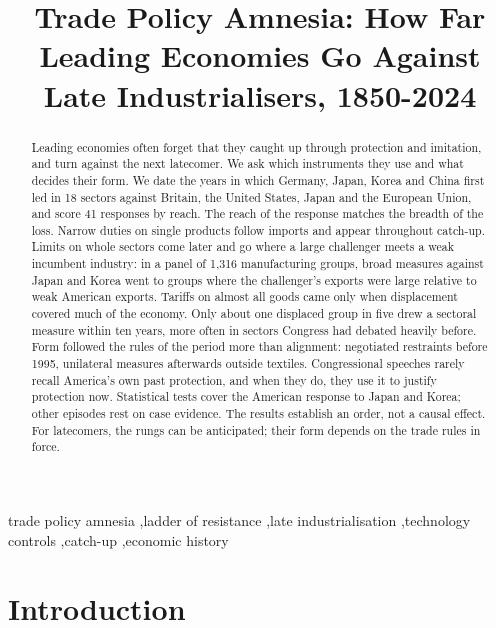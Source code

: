 \documentclass[review,authoryear,12pt]{elsarticle}
\begin{document}
\begin{frontmatter}
\title{Trade Policy Amnesia: How Far Leading Economies Go Against Late Industrialisers, 1850-2024}

\begin{abstract}
Leading economies often forget that they caught up through protection and imitation, and turn against the next latecomer. We ask which instruments they use and what decides their form. We date the years in which Germany, Japan, Korea and China first led in 18 sectors against Britain, the United States, Japan and the European Union, and score 41 responses by reach. The reach of the response matches the breadth of the loss. Narrow duties on single products follow imports and appear throughout catch-up. Limits on whole sectors come later and go where a large challenger meets a weak incumbent industry: in a panel of 1,316 manufacturing groups, broad measures against Japan and Korea went to groups where the challenger's exports were large relative to weak American exports. Tariffs on almost all goods came only when displacement covered much of the economy. Only about one displaced group in five drew a sectoral measure within ten years, more often in sectors Congress had debated heavily before. Form followed the rules of the period more than alignment: negotiated restraints before 1995, unilateral measures afterwards outside textiles. Congressional speeches rarely recall America's own past protection, and when they do, they use it to justify protection now. Statistical tests cover the American response to Japan and Korea; other episodes rest on case evidence. The results establish an order, not a causal effect. For latecomers, the rungs can be anticipated; their form depends on the trade rules in force.
\end{abstract}

\begin{keyword}
trade policy amnesia \sep ladder of resistance \sep late industrialisation \sep technology controls \sep catch-up \sep economic history
\end{keyword}
\end{frontmatter}

\section{Introduction}\label{sec:intro}
\end{document}
